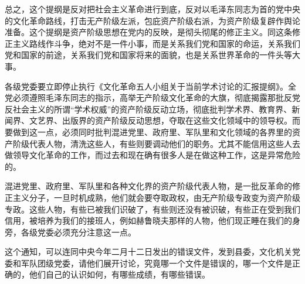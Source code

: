总之，这个提纲是反对把社会主义革命进行到底，反对以毛泽东同志为首的党中央的文化革命路线，打击无产阶级左派，包庇资产阶级右派，为资产阶级复辟作舆论准备。这个提纲是资产阶级思想在党内的反映，是彻头彻尾的修正主义。同这条修正主义路线作斗争，绝对不是一件小事，而是关系我们党和国家的命运，关系我们党和国家的前途，关系我们党和国家将来的面貌，也是关系世界革命的一件头等大事。

各级党委要立即停止执行《文化革命五人小组关于当前学术讨论的汇报提纲》。全党必须遵照毛泽东同志的指示，高举无产阶级文化革命的大旗，彻底揭露那批反党反社会主义的所谓“学术权威”的资产阶级反动立场，彻底批判学术界、教育界、新闻界、文艺界、出版界的资产阶级反动思想，夺取在这些文化领域中的领导权。而要做到这一点，必须同时批判混进党里、政府里、军队里和文化领域的各界里的资产阶级代表人物，清洗这些人，有些则要调动他们的职务。尤其不能信用这些人去做领导文化革命的工作，而过去和现在确有很多人是在做这种工作，这是异常危险的。

混进党里、政府里、军队里和各种文化界的资产阶级代表人物，是一批反革命的修正主义分子，一旦时机成熟，他们就会要夺取政权，由无产阶级专政变为资产阶级专政。这些人物，有些已被我们识破了，有些则还没有被识破，有些正在受到我们信用，被培养为我们的接班人，例如赫鲁晓夫那样的人物，他们现正睡在我们的身旁，各级党委必须充分注意这一点。

这个通知，可以连同中央今年二月十二日发出的错误文件，发到县委，文化机关党委和军队团级党委，请他们展开讨论，究竟哪一个文件是错误的，哪一个文件是正确的，他们自己的认识如何，有哪些成绩，有哪些错误。

